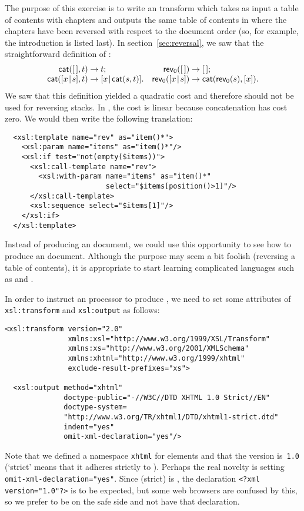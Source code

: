 
The purpose of this exercise is to write an \XSLT transform which
takes as input a table of contents with chapters and outputs the same
table of contents in \XML where the chapters have been reversed with
respect to the document order (so, for example, the introduction is
listed last). In section~\vref{sec:reversal}, we saw that the
straightforward definition of :
\begin{equation*}
\begin{array}{@{}r@{\;}l@{\;}lr@{\;}l@{\;}l@{}}
  \fun{cat}(\el,t)\index{cat@\fun{cat/2}}
& \rightarrow & t;
& \fun{rev}_0(\el)
& \rightarrow & \el;\\
  \fun{cat}(\cons{x}{s},t)
& \rightarrow & \cons{x}{\fun{cat}(s,t)}.
& \fun{rev}_0(\cons{x}{s})
& \rightarrow & \fun{cat}(\fun{rev}_0(s),[x]).
\end{array}
\end{equation*}
We saw that this definition yielded a quadratic cost and therefore
should not be used for reversing stacks. In \XSLT, the cost is linear
because concatenation has cost zero. We would then write the following
translation:
\begin{verbatim}
  <xsl:template name="rev" as="item()*">
    <xsl:param name="items" as="item()*"/>
    <xsl:if test="not(empty($items))">
      <xsl:call-template name="rev">
        <xsl:with-param name="items" as="item()*"
                        select="$items[position()>1]"/>
      </xsl:call-template>
      <xsl:sequence select="$items[1]"/>
    </xsl:if>
  </xsl:template>
\end{verbatim}
Instead of producing an \XML document, we could use this opportunity
to see how to produce an \XHTML document. Although the purpose may
seem a bit foolish (reversing a table of contents), it is appropriate
to start learning complicated languages such as \XSLT and \XHTML.

In order to instruct an \XSLT processor to produce \XHTML, we need to
set some attributes of \texttt{xsl:transform} and \texttt{xsl:output}
as follows:
\begin{verbatim}
<xsl:transform version="2.0"
               xmlns:xsl="http://www.w3.org/1999/XSL/Transform"
               xmlns:xs="http://www.w3.org/2001/XMLSchema"
               xmlns:xhtml="http://www.w3.org/1999/xhtml"
               exclude-result-prefixes="xs">

  <xsl:output method="xhtml"
              doctype-public="-//W3C//DTD XHTML 1.0 Strict//EN"
              doctype-system=
              "http://www.w3.org/TR/xhtml1/DTD/xhtml1-strict.dtd"
              indent="yes"
              omit-xml-declaration="yes"/>
\end{verbatim}
Note that we defined a namespace \texttt{xhtml} for \XHTML elements
and that the \XHTML version is~\texttt{1.0} (`strict' means that it
adheres strictly to \XML). Perhaps the real novelty is setting
\texttt{omit-xml-declaration="yes"}. Since \XHTML (strict) is \XML,
the declaration \texttt{<?xml version="1.0"?>} is to be expected, but
some web browsers are confused by this, so we prefer to be on the safe
side and not have that declaration.

